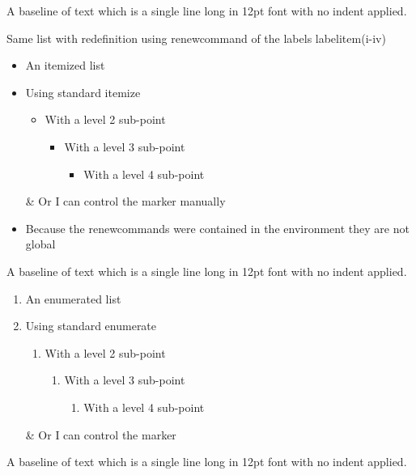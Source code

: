 \noindent
A baseline of text which is a single line long in 12pt font with no indent applied.

Same list with redefinition using renewcommand of the labels labelitem(i-iv)
\begin{itemize}
\renewcommand{\labelitemi}{*}
\renewcommand{\labelitemii}{**}
\renewcommand{\labelitemiii}{***}
\renewcommand{\labelitemiv}{****}
\item An itemized list
\item Using standard itemize
\begin{itemize}
\item With a level 2 sub-point
\begin{itemize}
\item With a level 3 sub-point
\begin{itemize}
\item With a level 4 sub-point
\end{itemize}
\end{itemize}
\end{itemize}
\item[\&] Or I can control the marker manually
\end{itemize}

\begin{itemize}
\item Because the renewcommands were contained in the environment they are not global
\end{itemize}

\noindent
A baseline of text which is a single line long in 12pt font with no indent applied.

\begin{enumerate}
\item An enumerated list
\item Using standard enumerate
\begin{enumerate}
\item With a level 2 sub-point
\begin{enumerate}
\item With a level 3 sub-point
\begin{enumerate}
\item With a level 4 sub-point
\end{enumerate}
\end{enumerate}
\end{enumerate}
\item[\&] Or I can control the marker
\end{enumerate}

\noindent
A baseline of text which is a single line long in 12pt font with no indent applied.

